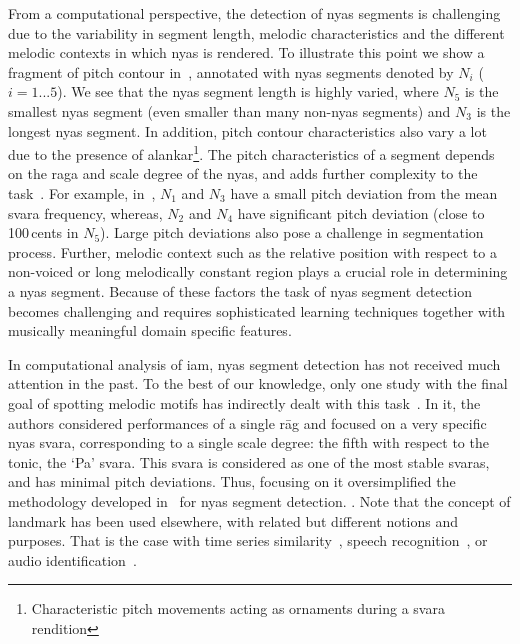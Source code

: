 {From a computational perspective, the detection of \gls{nyas} segments is challenging due to the variability in segment length, melodic characteristics and the different melodic contexts in which \gls{nyas} is rendered. To illustrate this point we show a fragment of pitch contour in~, annotated with \gls{nyas} segments denoted by $N_i$ ($i={1...5}$). We see that the \gls{nyas} segment length is highly varied, where $N_5$ is the smallest \gls{nyas} segment (even smaller than many non-\gls{nyas} segments) and $N_3$ is the longest \gls{nyas} segment. In addition, pitch contour characteristics also vary a lot due to the presence of \gls{alankar}\footnote{Characteristic pitch movements acting as ornaments during a \gls{svara} rendition}. The pitch characteristics of a segment depends on the \gls{raga} and scale degree of the \gls{nyas}, and adds further complexity to the task~\citep{Bagchee1998}. For example, in~, $N_1$ and $N_3$ have a small pitch deviation from the mean \gls{svara} frequency, whereas, $N_2$ and $N_4$ have significant pitch deviation (close to 100\,cents in $N_5$). Large pitch deviations also pose a challenge in segmentation process. Further, melodic context such as the relative position with respect to a non-voiced or long melodically constant region plays a crucial role in determining a \gls{nyas} segment. Because of these factors the task of \gls{nyas} segment detection becomes challenging and requires sophisticated learning techniques together with musically meaningful domain specific features.

In computational analysis of \gls{iam}, \gls{nyas} segment detection has not received much attention in the past. To the best of our knowledge, only one study with the final goal of spotting melodic motifs has indirectly dealt with this task~\citep{Ross2012}. In it, the authors considered performances of a single r\={a}g and focused on a very specific \gls{nyas} \gls{svara}, corresponding to a single scale degree: the fifth with respect to the tonic, the `Pa' \gls{svara}. This \gls{svara} is considered as one of the most stable \glspl{svara}, and has minimal pitch deviations. Thus, focusing on it oversimplified the methodology developed in~\cite{Ross2012} for \gls{nyas} segment detection. . Note that the concept of landmark has been used elsewhere, with related but different notions and purposes. That is the case with time series similarity~\citep{Perng00ICDE}, speech recognition~\citep{Jansen08JASA,Chen12ICASSP}, or audio identification~\citep{Duong13ICASSP}.

}
